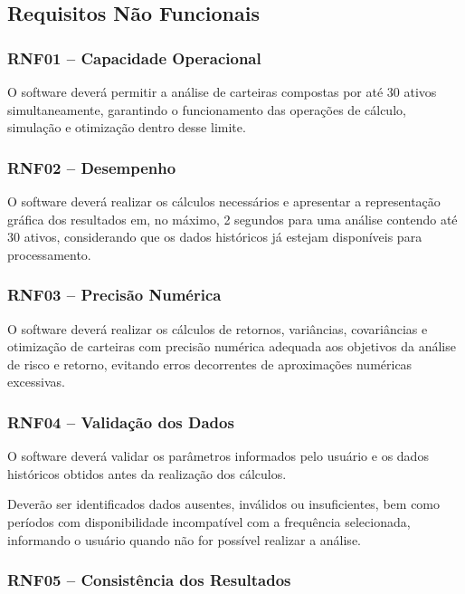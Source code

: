 \subsection{Requisitos Não Funcionais}

\subsubsection{RNF01 -- Capacidade Operacional}

O software deverá permitir a análise de carteiras compostas
por até 30 ativos simultaneamente, garantindo o funcionamento
das operações de cálculo, simulação e otimização dentro
desse limite.

\subsubsection{RNF02 -- Desempenho}

O software deverá realizar os cálculos necessários e
apresentar a representação gráfica dos resultados em,
no máximo, 2 segundos para uma análise contendo até 30
ativos, considerando que os dados históricos já estejam
disponíveis para processamento.

\subsubsection{RNF03 -- Precisão Numérica}

O software deverá realizar os cálculos de retornos,
variâncias, covariâncias e otimização de carteiras com
precisão numérica adequada aos objetivos da análise de
risco e retorno, evitando erros decorrentes de aproximações
numéricas excessivas.

\subsubsection{RNF04 -- Validação dos Dados}

O software deverá validar os parâmetros informados pelo
usuário e os dados históricos obtidos antes da realização
dos cálculos.

Deverão ser identificados dados ausentes, inválidos ou
insuficientes, bem como períodos com disponibilidade
incompatível com a frequência selecionada, informando
o usuário quando não for possível realizar a análise.

\subsubsection{RNF05 -- Consistência dos Resultados}

